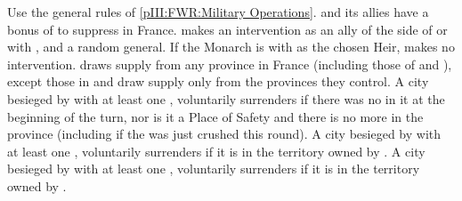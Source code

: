 \begin{digressions}



  \phmil
  \aparag Use the general rules of \ref{pIII:FWR:Military Operations}.
  \aparag \FRA and its allies have a bonus of  to suppress \REVOLT
  in France.
  \aparag \paysPalatinat makes an intervention as an ally of the side of
  \leaderNavarre or  with \ARMY\faceplus, \LD and a
  random general.  If the Monarch is  with  as the chosen Heir, \paysPalatinat makes no intervention.
  \aparag \FRA draws supply from any province in France (including those of
  \lig and \hug), except those in \REVOLT
  \aparag \lig and \hug draw supply only from the provinces they control.
  \bparag A city besieged by \FRA with at least one \ARMY \faceplus,
  voluntarily surrenders if there was no \REVOLT \faceplus in it at the
  beginning of the turn, nor is it a Place of Safety and there is no more
  \REVOLT in the province (including if the \REVOLT was just crushed this
  round).
  \bparag A city besieged by \lig with at least one \ARMY \faceplus,
  voluntarily surrenders if it is in the territory owned by \lig.
  \bparag A city besieged by \hug with at least one \ARMY \faceplus,
  voluntarily surrenders if it is in the territory owned by \hug.




\end{digressions}
